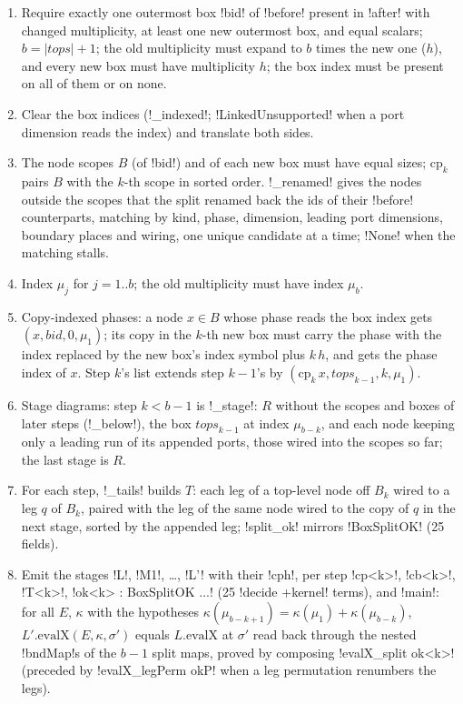 \begin{algorithm}
\begin{enumerate}
\item Require exactly one outermost box \py!bid! of \py!before! present in \py!after! with changed multiplicity, at least one new outermost box, and equal scalars; $b=|\mathit{tops}|+1$; the old multiplicity must expand to $b$ times the new one ($h$), and every new box must have multiplicity $h$; the box index must be present on all of them or on none.
\item Clear the box indices (\py!_indexed!; \py!LinkedUnsupported! when a port dimension reads the index) and translate both sides.
\item The node scopes $B$ (of \py!bid!) and of each new box must have equal sizes; $\mathrm{cp}_k$ pairs $B$ with the $k$-th scope in sorted order. \py!_renamed! gives the nodes outside the scopes that the split renamed back the ids of their \py!before! counterparts, matching by kind, phase, dimension, leading port dimensions, boundary places and wiring, one unique candidate at a time; \py!None! when the matching stalls.
\item Index $\mu_j$ for $j=1..b$; the old multiplicity must have index $\mu_b$.
\item Copy-indexed phases: a node $x\in B$ whose phase reads the box index gets $(x,\mathit{bid},0,\mu_1)$; its copy in the $k$-th new box must carry the phase with the index replaced by the new box's index symbol plus $k\,h$, and gets the phase index of $x$. Step $k$'s list extends step $k-1$'s by $(\mathrm{cp}_k\,x,\mathit{tops}_{k-1},k,\mu_1)$.
\item Stage diagrams: step $k<b-1$ is \py!_stage!: $R$ without the scopes and boxes of later steps (\py!_below!), the box $\mathit{tops}_{k-1}$ at index $\mu_{b-k}$, and each node keeping only a leading run of its appended ports, those wired into the scopes so far; the last stage is $R$.
\item For each step, \py!_tails! builds $T$: each leg of a top-level node off $B_k$ wired to a leg $q$ of $B_k$, paired with the leg of the same node wired to the copy of $q$ in the next stage, sorted by the appended leg; \py!split_ok! mirrors \lean!BoxSplitOK! (25 fields).
\item Emit the stages \lean!L!, \lean!M1!, \ldots, \lean!L'! with their \lean!cph!, per step \lean!cp<k>!, \lean!cb<k>!, \lean!T<k>!, \lean!ok<k> : BoxSplitOK ...! (25 \lean!decide +kernel! terms), and \lean!main!: for all $E$, $\kappa$ with the hypotheses $\kappa(\mu_{b-k+1})=\kappa(\mu_1)+\kappa(\mu_{b-k})$, $L'.\mathrm{evalX}(E,\kappa,\sigma')$ equals $L.\mathrm{evalX}$ at $\sigma'$ read back through the nested \lean!bndMap!s of the $b-1$ split maps, proved by composing \lean!evalX_split ok<k>! (preceded by \lean!evalX_legPerm okP! when a leg permutation renumbers the legs).
\end{enumerate}
\end{algorithm}

